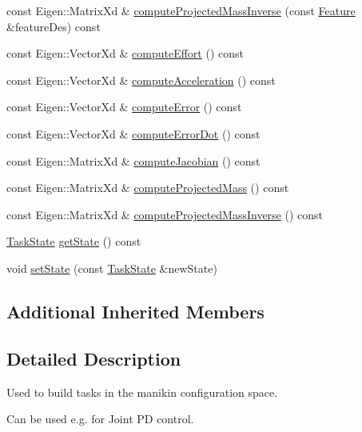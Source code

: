 \begin{DoxyCompactItemize}
\item 
const Eigen\+::\+Matrix\+Xd \& \hyperlink{classocra_1_1FullStateFeature_a9983ac97359bad5194affec30771c59f}{compute\+Projected\+Mass\+Inverse} (const \hyperlink{classocra_1_1Feature}{Feature} \&feature\+Des) const 
\item 
const Eigen\+::\+Vector\+Xd \& \hyperlink{classocra_1_1FullStateFeature_a3e5b229d3cb0fac9f9b71ab8746791e8}{compute\+Effort} () const 
\item 
const Eigen\+::\+Vector\+Xd \& \hyperlink{classocra_1_1FullStateFeature_a92e7318b44f92d2e3d5879dea809b841}{compute\+Acceleration} () const 
\item 
const Eigen\+::\+Vector\+Xd \& \hyperlink{classocra_1_1FullStateFeature_a21e612d78bafc23c6cae4ba12417da43}{compute\+Error} () const 
\item 
const Eigen\+::\+Vector\+Xd \& \hyperlink{classocra_1_1FullStateFeature_a20d1f3aa5a8e3e9f997fa13187aac6da}{compute\+Error\+Dot} () const 
\item 
const Eigen\+::\+Matrix\+Xd \& \hyperlink{classocra_1_1FullStateFeature_adbf798dc96ea1e19d890da1865017de0}{compute\+Jacobian} () const 
\item 
const Eigen\+::\+Matrix\+Xd \& \hyperlink{classocra_1_1FullStateFeature_aa64cf28427bfe4f2c1fdaffb48bf4e4a}{compute\+Projected\+Mass} () const 
\item 
const Eigen\+::\+Matrix\+Xd \& \hyperlink{classocra_1_1FullStateFeature_adf1e7be119f9db5b060876960cb6622d}{compute\+Projected\+Mass\+Inverse} () const 
\item 
\hyperlink{classocra_1_1TaskState}{Task\+State} \hyperlink{classocra_1_1FullStateFeature_a2009f9945cb21e3dea707686cf5c1536}{get\+State} () const 
\item 
void \hyperlink{classocra_1_1FullStateFeature_a77263aff16d7078ac19dc2eb6a196a65}{set\+State} (const \hyperlink{classocra_1_1TaskState}{Task\+State} \&new\+State)
\end{DoxyCompactItemize}
\subsection*{Additional Inherited Members}


\subsection{Detailed Description}
Used to build tasks in the manikin configuration space. 

Can be used e.\+g. for Joint PD control. 

